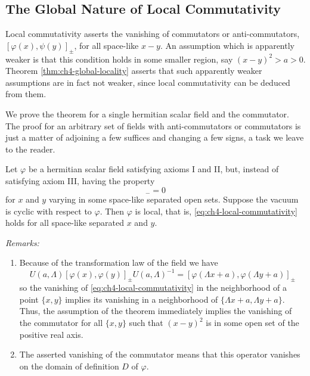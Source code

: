 \subsection{The Global Nature of Local Commutativity}
\label{sec:ch4-global-locality}

Local commutativity asserts the vanishing of commutators or
anti-commutators, $[\varphi(x),\psi(y)]_{\pm}$, for all space-like $x-y$.
An assumption which is apparently weaker is that this condition holds in some
smaller region, say $(x-y)^2>a>0$. Theorem \ref{thm:ch4-global-locality} asserts that such apparently
weaker assumptions are in fact not weaker, since local commutativity can be
deduced from them.

We prove the theorem for a single hermitian scalar field and the commutator.
The proof for an arbitrary set of fields with anti-commutators or commutators
is just a matter of adjoining a few suffices and changing a few signs, a task
we leave to the reader.

\begin{theorem}[4-1]\label{thm:ch4-global-locality}
Let $\varphi$ be a hermitian scalar field satisfying axioms I and II, but,
instead of satisfying axiom III, having the property
\begin{equation}
  [\varphi(x),\varphi(y)]_{-}=0
  \tag{4-1}\label{eq:ch4-local-commutativity}
\end{equation}
for $x$ and $y$ varying in some space-like separated open sets. Suppose the
vacuum is cyclic with respect to $\varphi$. Then $\varphi$ is local, that is,
\eqref{eq:ch4-local-commutativity} holds for all space-like separated $x$ and $y$.
\end{theorem}

\par\medskip\noindent\textit{Remarks:}

\begin{enumerate}
\item Because of the transformation law of the field we have
\begin{equation*}
  U(a,\Lambda)[\varphi(x),\varphi(y)]_{\pm}U(a,\Lambda)^{-1}
  =[\varphi(\Lambda x+a),\varphi(\Lambda y+a)]_{\pm}
\end{equation*}
so the vanishing of \eqref{eq:ch4-local-commutativity} in the neighborhood of a point $\{x,y\}$ implies
its vanishing in a neighborhood of $\{\Lambda x+a,\Lambda y+a\}$. Thus, the
assumption of the theorem immediately implies the vanishing of the commutator
for all $\{x,y\}$ such that $(x-y)^2$ is in some open set of the positive real
axis.

\item The asserted vanishing of the commutator means that this operator
vanishes on the domain of definition $D$ of $\varphi$.
\end{enumerate}


